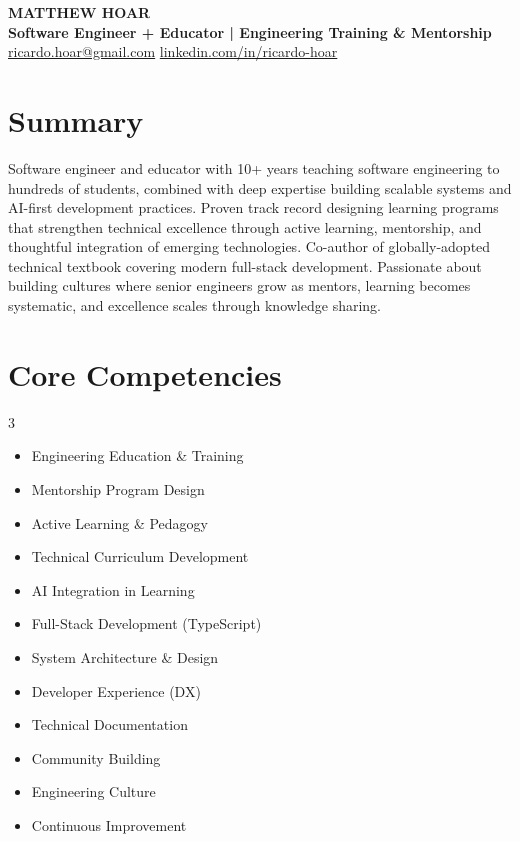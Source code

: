 \documentclass[11pt]{article}
\newcommand{\contact}[2]{
  \faIcon{at} \href{mailto:#1}{#1} \hfill
  \faIcon{linkedin} \href{https://linkedin.com/in/#2}{linkedin.com/in/#2}
}
\newcommand{\tech}[1]{\textcolor{secondary}{\textbf{#1}}}
\begin{document}
\begin{center}
    {\Huge \textbf{MATTHEW HOAR}} \\[4pt]
    {\Large \tech{Software Engineer + Educator | Engineering Training \& Mentorship}} \\[6pt]
\contact{ricardo.hoar@gmail.com}{ricardo-hoar}
\end{center}

\section*{Summary}
Software engineer and educator with 10+ years teaching software engineering to hundreds of students, combined with deep expertise building scalable systems and AI-first development practices. Proven track record designing learning programs that strengthen technical excellence through active learning, mentorship, and thoughtful integration of emerging technologies. Co-author of globally-adopted technical textbook covering modern full-stack development. Passionate about building cultures where senior engineers grow as mentors, learning becomes systematic, and excellence scales through knowledge sharing.

\section*{Core Competencies}
\begin{multicols}{3}
\begin{itemize}
    \item Engineering Education \& Training
    \item Mentorship Program Design
    \item Active Learning \& Pedagogy
    \item Technical Curriculum Development
    \item AI Integration in Learning
    \item Full-Stack Development (TypeScript)
    \item System Architecture \& Design
    \item Developer Experience (DX)
    \item Technical Documentation
    \item Community Building
    \item Engineering Culture
    \item Continuous Improvement
\end{itemize}
\end{multicols}
\end{document}
